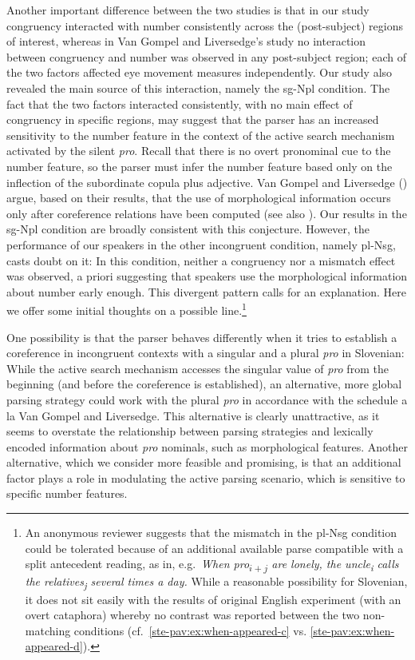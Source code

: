 \documentclass[output=paper,colorlinks,citecolor=brown]{langscibook}
\begin{document}
Another important difference between the two studies is that in our study congruency interacted with number consistently across the (post-subject) regions of interest, whereas in Van Gompel and Liversedge's study no interaction between congruency and number was observed in any post-subject region; each of the two factors affected eye movement measures independently. Our study also revealed the main source of this interaction, namely the sg-Npl condition. The fact that the two factors interacted consistently, with no main effect of congruency in specific regions, may suggest that the parser has an increased sensitivity to the number feature in the context of the active search mechanism activated by the silent \textit{pro}. Recall that there is no overt pronominal cue to the number feature, so the parser must infer the number feature based only on the inflection of the subordinate copula plus adjective. Van Gompel and Liversedge (\citeyear{vanGompelLiversedge2003}) argue, based on their results, that the use of morphological information occurs only after coreference relations have been computed (see also \citealt{cowart1987, kazaninaLauPhillips2007, kazaninaPhillips2010}). Our results in the sg-Npl condition are broadly consistent with this conjecture. However, the performance of our speakers in the other incongruent condition, namely pl-Nsg, casts doubt on it: In this condition, neither a congruency nor a mismatch effect was observed, a priori suggesting that speakers use the morphological information about number early enough. This divergent pattern calls for an explanation. Here we offer some initial thoughts on a possible line.{\footnote{An anonymous reviewer suggests that the mismatch in the pl-Nsg condition could be tolerated because of an additional available parse compatible with a split antecedent reading, as in, e.g.\ \textit{When pro\textsubscript{$i+j$} are lonely, the uncle\textsubscript{i} calls the relatives\textsubscript{j} several times a day.} While a reasonable possibility for Slovenian, it does not sit easily with the results of  original English experiment (with an overt cataphora) whereby no contrast was reported between the two non-matching conditions (cf.\ \ref{ste-pav:ex:when-appeared-c} vs. \ref{ste-pav:ex:when-appeared-d}).}}

One possibility is that the parser behaves differently when it tries to establish a coreference in incongruent contexts with a singular and a plural \textit{pro} in Slovenian: While the active search mechanism accesses the singular value of \textit{pro} from the beginning (and before the coreference is established), an alternative, more global parsing strategy could work with the plural \textit{pro} in accordance with the schedule a la Van Gompel and Liversedge. This alternative is clearly unattractive, as it seems to overstate the relationship between parsing strategies and lexically encoded information about \textit{pro} nominals, such as morphological features. Another alternative, which we consider more feasible and promising, is that an additional factor plays a role in modulating the active parsing scenario, which is sensitive to specific number features.
\end{document}
